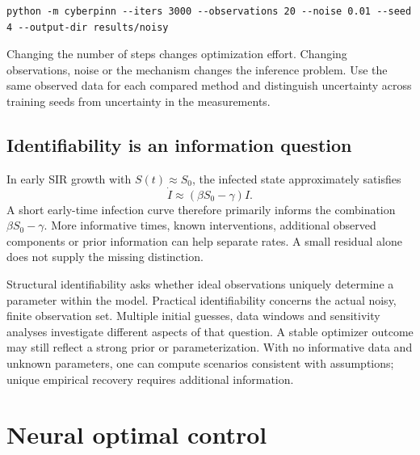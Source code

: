 \documentclass[11pt,a4paper]{article}
\theoremstyle{definition}
\theoremstyle{remark}
\begin{document}
\begin{lstlisting}[language={}]
python -m cyberpinn --iters 3000 --observations 20 --noise 0.01 --seed 4 --output-dir results/noisy
\end{lstlisting}
Changing the number of steps changes optimization effort. Changing observations, noise or the mechanism changes the inference problem. Use the same observed data for each compared method and distinguish uncertainty across training seeds from uncertainty in the measurements.

\subsection{Identifiability is an information question}
In early SIR growth with $S(t)\approx S_0$, the infected state approximately satisfies
\begin{equation}
\dot I\approx(\beta S_0-\gamma)I.
\end{equation}
A short early-time infection curve therefore primarily informs the combination $\beta S_0-\gamma$. More informative times, known interventions, additional observed components or prior information can help separate rates. A small residual alone does not supply the missing distinction.

Structural identifiability asks whether ideal observations uniquely determine a parameter within the model. Practical identifiability concerns the actual noisy, finite observation set. Multiple initial guesses, data windows and sensitivity analyses investigate different aspects of that question. A stable optimizer outcome may still reflect a strong prior or parameterization. With no informative data and unknown parameters, one can compute scenarios consistent with assumptions; unique empirical recovery requires additional information.

\section{Neural optimal control}
\end{document}
